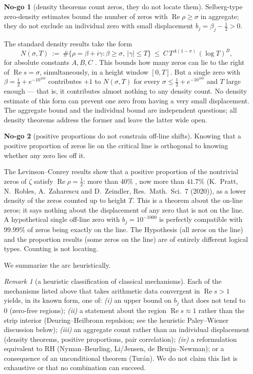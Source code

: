 \documentclass[11pt]{amsart}
\theoremstyle{definition}
\theoremstyle{remark}
\newtheorem{remark}[theorem]{Remark}
\theoremstyle{definition}
\newtheorem{nogo}{No-go}[section]
\renewcommand{\Re}{\operatorname{Re}}
\begin{document}
\begin{nogo}[density theorems count zeros, they do not locate them]\label{ng:density}
Selberg-type zero-density estimates bound the number of zeros with $\Re\rho\ge\sigma$ in aggregate; they
do not exclude an individual zero with small displacement $b_j=\beta_j-\tfrac12>0$.
\end{nogo}
\noindent The standard density results take the form
\[
   N(\sigma,T)\ :=\ \#\bigl\{\rho=\beta+i\gamma:\beta\ge\sigma,\ |\gamma|\le T\bigr\}
   \ \le\ C\,T^{A(1-\sigma)}\,(\log T)^B,
\]
for absolute constants $A,B,C$ \cite{Ingham,Huxley}. This bounds how many zeros can lie to the right of
$\Re s=\sigma$, simultaneously, in a height window $[0,T]$. But a single zero with $\beta=\tfrac12+
e^{-10^{100}}$ contributes $+1$ to $N(\sigma,T)$ for every $\sigma\le\tfrac12+e^{-10^{100}}$ and $T$
large enough --- that is, it contributes almost nothing to any density count. No density estimate of this
form can prevent one zero from having a very small displacement. The aggregate bound and the individual
bound are independent questions; all density theorems address the former and leave the latter wide open.

\begin{nogo}[positive proportions do not constrain off-line shifts]\label{ng:prop}
Knowing that a positive proportion of zeros lie on the critical line is orthogonal to knowing whether any
zero lies off it.
\end{nogo}
\noindent The Levinson--Conrey results \cite{Levinson,Conrey1989} show that a positive proportion of the
nontrivial zeros of $\zeta$ satisfy $\Re\rho=\tfrac12$: more than $40\%$ \cite{Conrey1989}, now more than
$41.7\%$ (K.~Pratt, N.~Robles, A.~Zaharescu and D.~Zeindler, Res.\ Math.\ Sci.\ 7 (2020)), as a lower
density of the zeros counted up to height $T$. This is a theorem about the on-line zeros; it says nothing
about the displacement of any zero that is not on the line. A hypothetical single off-line zero with
$b_j=10^{-1000}$ is perfectly compatible with $99.99\%$ of zeros being exactly on the line. The Hypothesis
(all zeros on the line) and the proportion results (some zeros on the line) are of entirely different
logical types. Counting is not locating.

\noindent We summarize the arc heuristically.

\begin{remark}[a heuristic classification of classical mechanisms]\label{thm:fourway}
Each of the mechanisms listed above that takes arithmetic data convergent in $\Re s>1$ yields, in its known
form, one of: \emph{(i)} an upper bound on $b_j$ that does not tend to $0$ (zero-free regions);
\emph{(ii)} a statement about the region $\Re s\approx1$ rather than the strip interior (Deuring--Heilbronn
repulsion; see the heuristic Paley--Wiener discussion below); \emph{(iii)} an aggregate count rather than
an individual displacement (density theorems, positive proportions, pair correlation); \emph{(iv)} a
reformulation equivalent to RH (Nyman--Beurling, Li/Jensen, de Bruijn--Newman); or a consequence of an
unconditional theorem (Tur\'an). We do not claim this list is exhaustive or that no combination can
succeed.
\end{remark}
\end{document}
